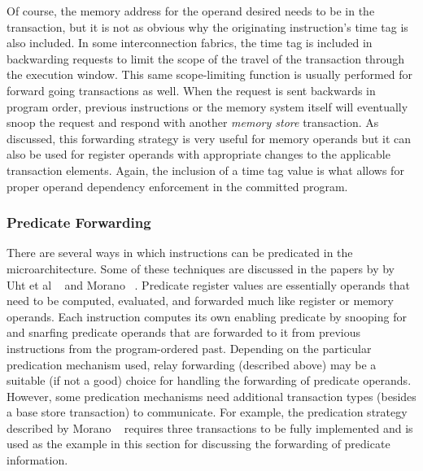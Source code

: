 %
Of course, the memory address for the operand desired
needs to be in the transaction, but it is not as obvious why
the originating instruction's time tag is also included.  In some
interconnection fabrics, the time tag is included in backwarding
requests to limit the scope of the travel of the transaction
through the execution window.  This same scope-limiting function
is usually performed for forward going transactions as well.
When the request is sent backwards in program order, previous
instructions or the memory system itself will eventually snoop
the request and respond with another \textit{memory store}
transaction.
As discussed, this forwarding strategy is very useful for memory
operands but it can also be used for register operands with
appropriate changes to the applicable transaction elements.
Again, the inclusion of a time tag value is what allows
for proper operand dependency enforcement
in the committed program.
%
%
\subsubsection{Predicate Forwarding}
%
There are several ways in which instructions can be predicated
in the microarchitecture.  
Some of these techniques are discussed in the papers by
by Uht et al ~\cite{Uht01} and Morano ~\cite{Morano02}.
Predicate register values are essentially
operands that need to be computed, evaluated, and forwarded
much like register or memory operands.
Each instruction computes its own enabling predicate by
snooping for and snarfing predicate operands that are forwarded
to it from previous instructions from the program-ordered past.
Depending on the particular predication mechanism used,
relay forwarding (described above) may be a suitable (if not a good) choice 
for handling the forwarding of predicate operands.
However, some predication mechanisms need additional transaction
types (besides a base store transaction) to communicate.
For example, the predication strategy described by Morano ~\cite{Morano02}
requires three transactions to be fully implemented and is
used as the example in this section for discussing the forwarding
of predicate information.

